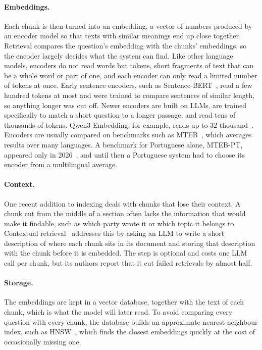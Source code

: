 \paragraph{Embeddings.} Each chunk is then turned into an embedding, a vector of numbers produced by an encoder model so that texts with similar meanings end up close together. Retrieval compares the question's embedding with the chunks' embeddings, so the encoder largely decides what the system can find. Like other language models, encoders do not read words but tokens, short fragments of text that can be a whole word or part of one, and each encoder can only read a limited number of tokens at once. Early sentence encoders, such as Sentence-BERT~\citep{reimers2019sentencebert}, read a few hundred tokens at most and were trained to compare sentences of similar length, so anything longer was cut off. Newer encoders are built on LLMs, are trained specifically to match a short question to a longer passage, and read tens of thousands of tokens. Qwen3-Embedding, for example, reads up to 32 thousand~\citep{zhang2025qwen3embedding}. Encoders are usually compared on benchmarks such as MTEB~\citep{mtebmassivetextembedding}, which averages results over many languages. A benchmark for Portuguese alone, MTEB-PT, appeared only in 2026~\citep{okamura2026mtebpt}, and until then a Portuguese system had to choose its encoder from a multilingual average.

\paragraph{Context.} One recent addition to indexing deals with chunks that lose their context. A chunk cut from the middle of a section often lacks the information that would make it findable, such as which party wrote it or which topic it belongs to. Contextual retrieval~\citep{anthropic2024contextual} addresses this by asking an LLM to write a short description of where each chunk sits in its document and storing that description with the chunk before it is embedded. The step is optional and costs one LLM call per chunk, but its authors report that it cut failed retrievals by almost half.

\paragraph{Storage.} The embeddings are kept in a vector database, together with the text of each chunk, which is what the model will later read. To avoid comparing every question with every chunk, the database builds an approximate nearest-neighbour index, such as HNSW~\citep{malkov2020hnsw}, which finds the closest embeddings quickly at the cost of occasionally missing one.

